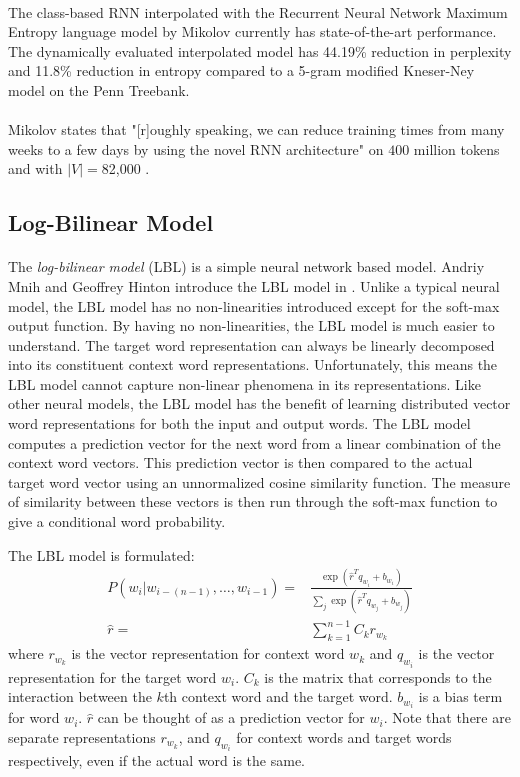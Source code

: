 \paragraph{}
The class-based RNN interpolated with the Recurrent Neural Network Maximum Entropy language model by Mikolov \cite{Mikolov2012} currently has state-of-the-art performance. The dynamically evaluated interpolated model has 44.19\% reduction in perplexity and 11.8\% reduction in entropy compared to a 5-gram modified Kneser-Ney model on the Penn Treebank.
\paragraph{}
Mikolov states that "[r]oughly speaking, we can reduce training times from many weeks to a few days by using the novel RNN architecture" on $400$ million tokens and with $|V|=$82,000 \cite[pg. 93]{Mikolov2012}. 

\subsection{Log-Bilinear Model} \label{sec:lbl}
\paragraph{}
The \emph{log-bilinear model} (LBL) is a simple neural network based model. Andriy Mnih and Geoffrey Hinton introduce the LBL model in \cite{MnihHinton2007}. Unlike a typical neural model, the LBL model has no non-linearities introduced except for the soft-max output function. By having no non-linearities, the LBL model is much easier to understand. The target word representation can always be linearly decomposed into its constituent context word representations. Unfortunately, this means the LBL model cannot capture non-linear phenomena in its representations. Like other neural models, the LBL model has the benefit of learning distributed vector word representations for both the input and output words.  The LBL model computes a prediction vector for the next word from a linear combination of the context word vectors. This prediction vector is then compared to the actual target word vector using an unnormalized cosine similarity function. The measure of similarity between these vectors is then run through the soft-max function to give a conditional word probability.

The LBL model is formulated:
\begin{align}
P(w_i | w_{i-(n-1)},\dots, w_{i-1})  =& \frac{ \exp( \hat{r}^T q_{w_i} +b_{w_i}) } { \sum_j \exp( \hat{r}^T q_{w_j} +b_{w_j})} \label{eq:LBL}
\\ 
\hat{r} =& \sum_{k=1}^{n-1} C_k r_{w_k} \nonumber
\end{align} 
where $r_{w_k}$ is the vector representation for context word $w_k$ and $q_{w_i}$ is the vector representation for the target word $w_i$. $C_k$ is the matrix that corresponds to the interaction between the $k$th context word and the target word. $b_{w_i}$ is a bias term for word $w_i$. $\hat{r}$ can be thought of as a prediction vector for $w_i$. Note that there are separate representations $r_{w_k}$, and $q_{w_i}$ for context words and target words respectively, even if the actual word is the same.

